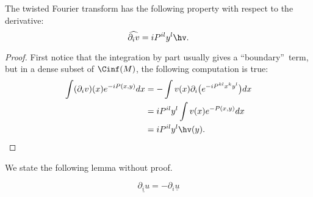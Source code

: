 \begin{lemma}
	The twisted Fourier transform has the following property with respect to the derivative:
	\[
		\widehat{\partial_iv}=iP^{il}y^l\hv.
	\]
\end{lemma}
\begin{proof}
	First notice that the integration by part usually gives a ``boundary''\ term, but in a dense subset of $\Cinf(M)$, the following computation is true:
	\begin{equation}
		\begin{split}
			\int(\partial_iv)(x)e^{-iP(x,y)}dx&=-\int v(x)\partial_i\big(e^{-iP^{kl}x^ky^l}\big)dx\\
			&=iP^{il}y^l\int v(x)e^{-P(x,y)}dx\\
			&=iP^{il}y^l\hv(y).
		\end{split}
	\end{equation}
\end{proof}

We state the following lemma without proof.
\begin{lemma}
	\[
		\underline{\partial_iu}=-\partial_i\underline{u}
	\]
\end{lemma}

